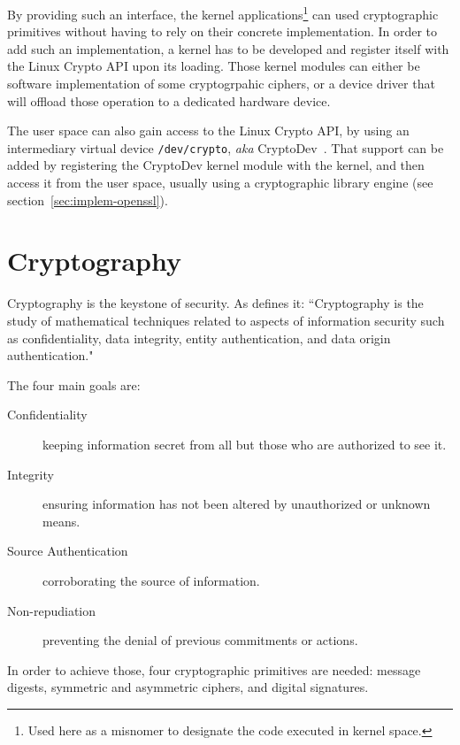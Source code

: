 By providing such an interface, the kernel applications\footnote{Used here as a misnomer to designate the code executed in kernel space.} can used cryptographic primitives without having to rely on their concrete implementation.
In order to add such an implementation, a kernel has to be developed and register itself with the Linux Crypto API upon its loading.
Those kernel modules can either be software implementation of some cryptogrpahic ciphers, or a device driver that will offload those operation to a dedicated hardware device.\newline{}

The user space can also gain access to the Linux Crypto API, by using an intermediary virtual device \texttt{/dev/crypto}, \textit{aka} CryptoDev~\cite{cryptodev}.
That support can be added by registering the CryptoDev kernel module with the kernel, and then access it from the user space, usually using a cryptographic library engine (see section~\ref{sec:implem-openssl}).


\section{Cryptography}

Cryptography is the keystone of security. As \citet{Menezes1996} defines it: ``Cryptography is the study of mathematical techniques related to aspects of information security such as confidentiality, data integrity, entity authentication, and data origin authentication."

The four main goals are:
\begin{description}
	\item[Confidentiality] keeping information secret from all but those who are authorized to see it.
	\item[Integrity] ensuring information has not been altered by unauthorized or unknown means.
	\item[Source Authentication] corroborating the source of information.
	\item[Non-repudiation] preventing the denial of previous commitments or actions.
\end{description}

In order to achieve those, four cryptographic primitives are needed: message digests, symmetric and asymmetric ciphers, and digital signatures.








